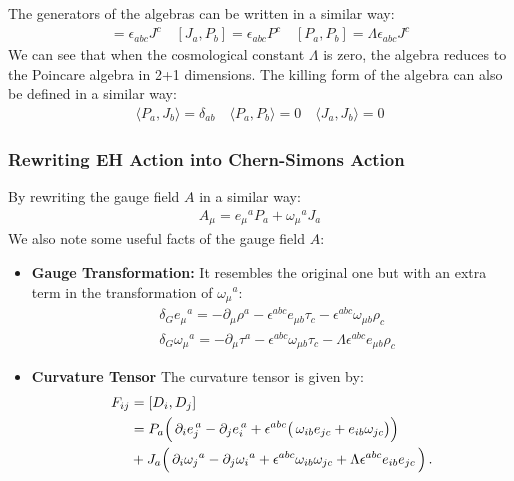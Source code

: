 The generators of the algebras can be written in a similar way:
\begin{align}
  [J_a, J_b]  = \epsilon_{abc} J^c \quad
  [J_a, P_b]  = \epsilon_{abc} P^c \quad
  [P_a, P_b]  = \Lambda \epsilon_{abc} J^c
\end{align}
We can see that when the cosmological constant $ \Lambda $ is zero,
the algebra reduces to the Poincare algebra in 2+1 dimensions. The
killing form of the algebra can also be defined in a similar way:
\begin{align}
  \langle P_a, J_b \rangle  = \delta_{ab} \quad \langle P_a, P_b
  \rangle  = 0 \quad
  \langle J_a, J_b \rangle  = 0
\end{align}

\subsubsection{Rewriting EH Action into Chern-Simons Action}

By rewriting the gauge field $ A $ in a similar way:
\begin{align}
  A_\mu = e_\mu{}^a P_a + \omega_\mu{}^a J_a
\end{align}
We also note some useful facts of the gauge field $ A $:
\begin{itemize}
  \item \textbf{Gauge Transformation:} It resembles the original one
    but with an extra term in the transformation of $ \omega_\mu{}^a $:
    \begin{align}\label{eq:gaugetransformcos}
      & \delta_G e_\mu{}^a = -\partial_\mu \rho^a - \epsilon^{abc} e_{\mu b}
      \tau_c - \epsilon^{abc} \omega_{\mu b} \rho_c \\
      &\delta_G \omega_\mu{}^a = -\partial_\mu \tau^a - \epsilon^{abc}
      \omega_{\mu b}
      \tau_c - \Lambda \epsilon^{abc} e_{\mu b} \rho_c
    \end{align}
  \item \textbf{Curvature Tensor} The curvature tensor is given by:
    \begin{align}\label{eq:curvaturetensorcos}
      F_{ij}&=\left[{D}_{i},{D}_{j}\right]\\
      &=P_{a}\Big{(}\,\partial_{i}e_{j}^{\,a}-\partial_{j}e_{i}^{\,a}+\epsilon^{abc}\big{(}\,\omega_{ib}e_{jc}+e_{ib}\omega_{jc}\big{)}\Big{)}
      \\
      &+J_{a}\Big{(}\,\partial_{i}\omega_{j}{}^{a}-\partial_{j}\omega_{i}{}^{a}+\epsilon^{abc}\omega_{ib}\omega_{jc}+\Lambda
      \epsilon^{abc} e_{ib} e_{jc} \,\Big{)}\,.
    \end{align}
\end{itemize}

